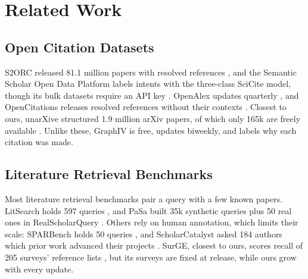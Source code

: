 \section{Related Work}
\label{sec:related}

\subsection{Open Citation Datasets}
S2ORC released 81.1 million papers with resolved references \citep{lo2020s2orc}, and the Semantic Scholar Open Data Platform labels intents with the three-class SciCite model, though its bulk datasets require an API key \citep{kinney2023s2,cohan2019scaffolds}. OpenAlex updates quarterly \citep{priem2022openalex}, and OpenCitations releases resolved references without their contexts \citep{peroni2019opencitations}. Closest to ours, unarXive structured 1.9 million arXiv papers, of which only 165k are freely available \citep{saier2023unarxive}. Unlike these, GraphIV is free, updates biweekly, and labels why each citation was made.

\subsection{Literature Retrieval Benchmarks}
Most literature retrieval benchmarks pair a query with a few known papers. LitSearch holds 597 queries \citep{ajith2024litsearch}, and PaSa built 35k synthetic queries plus 50 real ones in RealScholarQuery \citep{he2025pasa}. Others rely on human annotation, which limits their scale: SPARBench holds 50 queries \citep{shi2025spar}, and ScholarCatalyst asked 184 authors which prior work advanced their projects \citep{kim2026scholarcatalyst}. SurGE, closest to ours, scores recall of 205 surveys' reference lists \citep{su2025surge}, but its surveys are fixed at release, while ours grow with every update.

